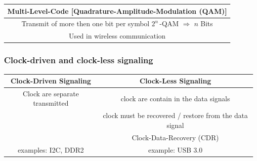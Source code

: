 \begin{table}[!h]
\begin{tabular}{|c|l|c|}
		\multicolumn{3}{|c|}{\textbf{Multi-Level-Code [Quadrature-Amplitude-Modulation (QAM)]}}                                                                    \\ \hline
		\multicolumn{3}{|c|}{Transmit of more then one bit per symbol \quad  $2^n$\,-QAM $\Rightarrow$ $n$ Bits}                                                   \\ \hline
		\multicolumn{3}{|c|}{Used in wireless communication}                                                                                                       \\ \hline

	\end{tabular}
\end{table}

\newpage
\subsubsection{Clock-driven and clock-less signaling}
\begin{table}[!h]
	\centering
	\begin{tabular}{|c|c|}
		\hline
		\textbf{Clock-Driven Signaling} &             \textbf{Clock-Less Signaling}              \\ \hline\hline
		Clock are separate transmitted  &         clock are contain in the data signals          \\ \hline
		                                & clock must be recovered / restore from the data signal \\
		                                &               Clock-Data-Recovery (CDR)                \\ \hline
		      examples: I2C, DDR2       &                    example: USB 3.0                    \\ \hline
	\end{tabular}
\end{table}

